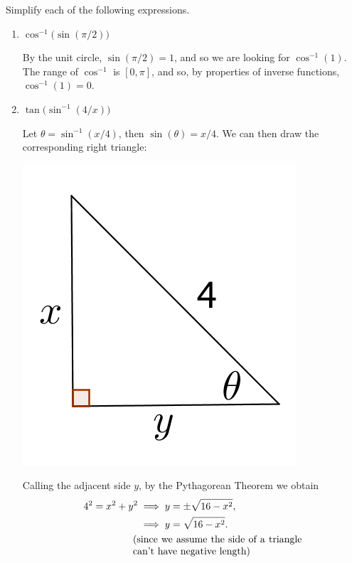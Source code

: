 \documentclass[nooutcomes]{ximera}
\begin{document}
    \begin{problem}
  Simplify each of the following expressions.
  \begin{enumerate}
    \item
      $\cos^{-1} \bigl( \sin(\pi/2) \bigr)$
      \begin{freeResponse}
        By the unit circle, $\sin(\pi/2) = 1$, and so we are looking for $\cos^{-1}(1)$.
        The range of $\cos^{-1}$ is $[0, \pi]$, and so, by properties of inverse functions, $\cos^{-1}(1) = 0$.
      \end{freeResponse}

    \item
      $\tan \bigl( \sin^{-1}(4/x ) \bigr)$
      \begin{freeResponse}
        Let $\theta = \sin^{-1}(x/4)$, then $\sin(\theta) = x/4$.
        We can then draw the corresponding right triangle:
        \begin{image}
          \includegraphics[scale = 0.4]{figure5.png}
        \end{image}
        Calling the adjacent side $y$, by the Pythagorean Theorem we obtain
        \begin{align*}
          4^2 = x^2 + y^2 &\implies y = \pm\sqrt{16-x^2}, \\
                         &\implies y = \sqrt{16-x^2}.\\
                         &\hspace{-0.5em} \mbox{\parbox[b][]{6cm}{(since we assume the side of a triangle can't have negative length)}}

\end{align*}
\end{freeResponse}
\end{enumerate}
\end{problem}
\end{document}
